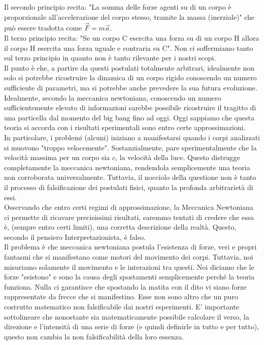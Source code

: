 \documentclass[]{article}
\begin{document}
	Il secondo principio recita: "La somma delle forze agenti su di un corpo è proporzionale all'accelerazione del corpo stesso, tramite la massa (inerziale)" che può essere tradotta come $\vec{F}=m\vec{a}$.\\
	Il terzo principio recita: "Se un corpo C esercita una forza su di un corpo H allora il corpo H esercita una forza uguale e contraria su C". Non ci soffermiamo tanto sul terzo principio in quanto non è tanto rilevante per i nostri scopi.\\
	Il punto è che, a partire da questi postulati totalmente arbitrari, idealmente non solo si potrebbe ricostruire la dinamica di un corpo rigido conoscendo un numero sufficiente di parametri, ma si potrebbe anche prevedere la sua futura evoluzione. Idealmente, secondo la meccanica newtoniana, conoscendo un numero sufficientemente elevato di informazioni sarebbe possibile ricostruire il tragitto di una particella dal momento del big bang fino ad oggi. Oggi sappiamo che questa teoria si accorda con i risultati sperimentali sono entro certe approssimazioni. \\
	In particolare, i problemi (alcuni) iniziano a manifestarsi quando i corpi analizzati si muovono "troppo velocemente". Sostanzialmente, pare sperimentalmente che la velocità massima per un corpo sia $c$, la velocità della luce. Questo distrugge completamente la meccanica newtoniana, rendendola semplicemente una teoria non corroborata universalmente. Tuttavia, il nocciolo della questione non è tanto il processo di falsificazione dei postulati fisici, quanto la profonda arbitrarietà di essi.\\
	Osservando che entro certi regimi di approssimazione,  la Meccanica Newtoniana ci permette di ricavare precisissimi risultati, saremmo tentati di credere che essa è, (sempre entro certi limiti), una corretta descrizione della realtà. Questo, secondo il pensiero Interpretazionista, è falso. 
	\\
	Il problema è che meccanica newtoniana postula l'esistenza di forze, veri e propri fantasmi che si manifestano come motori del movimento dei corpi. Tuttavia, noi misuriamo solamente il movimento e le interazioni tra questi. Noi diciamo che le forze "esistono" e sono la causa degli spostamenti semplicemente perché la teoria funziona. Nulla ci garantisce che spostando la matita con il dito vi siano forze rappresentate da frecce che si manifestino. Esse non sono altro che un puro costrutto matematico non falsificabile dai nostri esperimenti. E' importante sottolineare che nonostante sia matematicamente possibile calcolare il verso, la direzione e l'intensità di una serie di forze (e quindi definirle in tutto e per tutto), questo non cambia la non falsificabilità della loro essenza.\\
\end{document}
